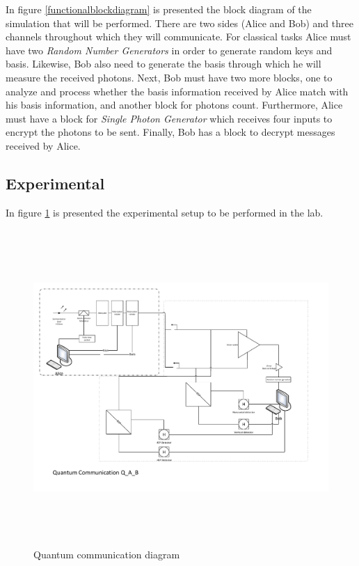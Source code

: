 In figure \ref{functionalblockdiagram} is presented the block diagram of the simulation that will be performed. There are two sides (Alice and Bob) and three channels throughout which they will communicate. For classical tasks Alice must have two \textit{Random Number Generators} in order to generate random keys and basis. Likewise, Bob also need to generate the basis through which he will measure the received photons. Next, Bob must have two more blocks, one to analyze and process whether the basis information received by Alice match with his basis information, and another block for photons count. Furthermore, Alice must have a block for \textit{Single Photon Generator} which receives four inputs to encrypt the photons to be sent. Finally, Bob has a block to decrypt messages received by Alice.

\subsection{Experimental}
In figure \ref{quantumchannelcommunication} is presented the experimental setup to be performed in the lab.

\begin{figure}[H]
	\centering \includegraphics[width=1.2\textwidth,height=12cm]{./sdf/ot_with_discrete_variables/figures/OT_experimental_setup.pdf}
	\caption{Quantum communication diagram}\label{quantumchannelcommunication}
\end{figure} 